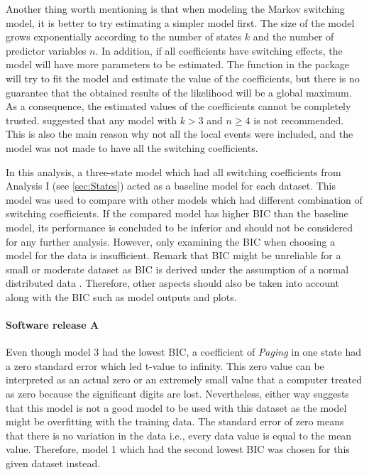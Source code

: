 Another thing worth mentioning is that when modeling the Markov switching
model, it is better to try estimating a simpler model first. The size
of the model grows exponentially according to the number of states
$k$ and the number of predictor variables $n$. In addition, if all
coefficients have switching effects, the model will have more parameters
to be estimated. The function in the package will try to fit the model
and estimate the value of the coefficients, but there is no guarantee
that the obtained results of the likelihood will be a global maximum.
As a consequence, the estimated values of the coefficients cannot
be completely trusted. \citet{perlin2015ms_regress} suggested that
any model with $k>3$ and $n\geq4$ is not recommended. This is also
the main reason why not all the local events were included, and the
model was not made to have all the switching coefficients. 

In this analysis, a three-state model which had all switching coefficients
from Analysis I (see \ref{sec:States}) acted as a baseline model
for each dataset. This model was used to compare with other models
which had different combination of switching coefficients. If the
compared model has higher BIC than the baseline model, its performance
is concluded to be inferior and should not be considered for any further
analysis. However, only examining the BIC when choosing a model for
the data is insufficient. Remark that BIC might be unreliable for
a small or moderate dataset as BIC is derived under the assumption
of a normal distributed data \citep{ryden2008versus}. Therefore,
other aspects should also be taken into account along with the BIC
such as model outputs and plots. 

\paragraph*{Software release A}

Even though model 3 had the lowest BIC, a coefficient of \emph{Paging}
in one state had a zero standard error which led t-value to infinity.
This zero value can be interpreted as an actual zero or an extremely
small value that a computer treated as zero because the significant
digits are lost. Nevertheless, either way suggests that this model
is not a good model to be used with this dataset as the model might
be overfitting with the training data. The standard error of zero
means that there is no variation in the data i.e., every data value
is equal to the mean value. Therefore, model 1 which had the second
lowest BIC was chosen for this given dataset instead. %
\begin{comment}
The t statistic is the coefficient divided by its standard error.
The standard error is an estimate of the standard deviation of the
coefficient, the amount it varies across cases. It can be thought
of as a measure of the precision with which the regression coefficient
is measured. If a coefficient is large compared to its standard error,
then it is probably different from 0.
\end{comment}


